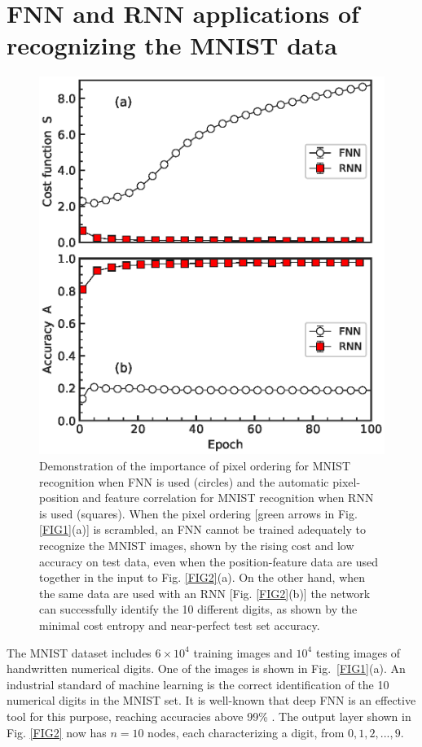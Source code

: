 \section{FNN and RNN applications of recognizing the MNIST data}
\label{AppMNIST}
\begin{figure}[b]
	\includegraphics[width=\columnwidth]{./figs/FIG5.eps}
	\caption{
		Demonstration of the importance of pixel ordering for MNIST recognition when FNN is used (circles) and the automatic pixel-position and feature correlation for MNIST recognition when RNN is used (squares). When the pixel ordering [green arrows in Fig. \ref{FIG1}(a)] is scrambled, an FNN cannot be trained adequately to recognize the MNIST images, shown by the rising cost and low accuracy on test data, even
		when the position-feature data are used together in the input to Fig. \ref{FIG2}(a). On the other hand, when the same data are used with an RNN [Fig. \ref{FIG2}(b)] the network can successfully identify the 10 different digits, as shown by the minimal cost entropy and near-perfect test set accuracy.}
	\label{MNIST}
\end{figure}

The MNIST dataset includes $6\times 10^4$ training images and $10^4$ testing images of handwritten numerical digits. One of the images is shown in Fig.~\ref{FIG1}(a). An industrial standard of machine learning is the correct identification of the 10 numerical digits in the MNIST set. It is well-known that deep FNN is an effective tool for this purpose, reaching accuracies above 99\% \cite{schmidhuber_deep}. The output layer shown in Fig. \ref{FIG2} now has $n=10$ nodes, each characterizing a digit, from $0, 1, 2, ..., 9$.

